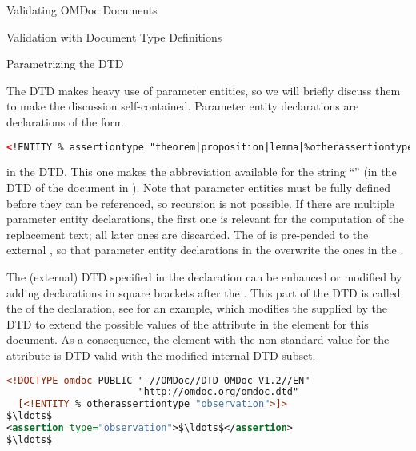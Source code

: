 \begin{tchapter}[id=validating]{Validating OMDoc Documents}
\begin{tsection}[id=validate-dtd]{Validation with Document Type Definitions}
\begin{tsubsection}[id=parameter-entities]{Parametrizing the DTD}

  The {\omdoc} DTD makes heavy use of parameter entities,
  so we will briefly discuss them to make the discussion self-contained. Parameter
  entity declarations are declarations of the form
\begin{center}
\begin{lstlisting}[language=XML,index={ENTITY}]
<!ENTITY % assertiontype "theorem|proposition|lemma|%otherassertiontype;">
\end{lstlisting}
\end{center}
in the DTD. This one makes the abbreviation {} available for the
string ``'' (in the DTD of the document in
{}). Note that parameter entities must be fully defined before they can
be referenced, so recursion is not possible. If there
are multiple parameter entity declarations, the first one is relevant for the computation
of the replacement text; all later ones are discarded. The {} of
{} is pre-pended to the external {}, so
that parameter entity declarations in the {} overwrite the ones
in the {}.

The (external) DTD specified in the {} declaration can be enhanced or
modified by adding declarations in square brackets after the {}
{}. This part of the DTD is called the
{} of the {}
declaration, see {} for an example, which modifies the
{} {} supplied by the {\omdoc}
DTD to extend the possible values of the {} attribute in the
{} element for this document. As a consequence, the
{} element with the non-standard value for the
{} attribute is DTD-valid with the modified internal DTD
subset.

\begin{lstlisting}[label=lst:internal,language=XML,morekeywords={omdoc},mathescape,
  caption={A Document Type Declaration with Internal Subset},
  index={DOCTYPE,ENTITY,ELEMENT,ATTLIST,omdoc,PUBLIC}]
<!DOCTYPE omdoc PUBLIC "-//OMDoc//DTD OMDoc V1.2//EN"
                       "http://omdoc.org/omdoc.dtd" 
  [<!ENTITY % otherassertiontype "observation">]>
$\ldots$
<assertion type="observation">$\ldots$</assertion>
$\ldots$
\end{lstlisting}
\end{tsubsection}


\end{tsection}
\end{tchapter}
